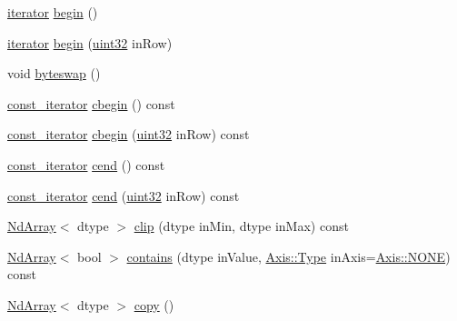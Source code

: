 \begin{DoxyCompactItemize}
\item 
\mbox{\hyperlink{class_num_c_1_1_nd_array_a49cd61f019d7106a40ffdb9c3ee98f08}{iterator}} \mbox{\hyperlink{class_num_c_1_1_nd_array_a3bba56461121f422750bd6b7a69bd9c4}{begin}} ()
\item 
\mbox{\hyperlink{class_num_c_1_1_nd_array_a49cd61f019d7106a40ffdb9c3ee98f08}{iterator}} \mbox{\hyperlink{class_num_c_1_1_nd_array_a6cca558bd443f861482a6856980fc80f}{begin}} (\mbox{\hyperlink{namespace_num_c_ae685802ca6d3035f2b400b081e3953fa}{uint32}} in\+Row)
\item 
void \mbox{\hyperlink{class_num_c_1_1_nd_array_a847dd08abd0ccc23ee792ab503cf60c1}{byteswap}} ()
\item 
\mbox{\hyperlink{class_num_c_1_1_nd_array_a445cec326684b0066bddae07ba06eddf}{const\+\_\+iterator}} \mbox{\hyperlink{class_num_c_1_1_nd_array_ac80d7125ea62fcd159e40387c2389081}{cbegin}} () const
\item 
\mbox{\hyperlink{class_num_c_1_1_nd_array_a445cec326684b0066bddae07ba06eddf}{const\+\_\+iterator}} \mbox{\hyperlink{class_num_c_1_1_nd_array_a15d151b34c7fa94d5710f07fe2327663}{cbegin}} (\mbox{\hyperlink{namespace_num_c_ae685802ca6d3035f2b400b081e3953fa}{uint32}} in\+Row) const
\item 
\mbox{\hyperlink{class_num_c_1_1_nd_array_a445cec326684b0066bddae07ba06eddf}{const\+\_\+iterator}} \mbox{\hyperlink{class_num_c_1_1_nd_array_a7299d5d8949b5348dde9d05f96f20b59}{cend}} () const
\item 
\mbox{\hyperlink{class_num_c_1_1_nd_array_a445cec326684b0066bddae07ba06eddf}{const\+\_\+iterator}} \mbox{\hyperlink{class_num_c_1_1_nd_array_ab0ec9dc7cfc8b4aaf2b89a4d05832c73}{cend}} (\mbox{\hyperlink{namespace_num_c_ae685802ca6d3035f2b400b081e3953fa}{uint32}} in\+Row) const
\item 
\mbox{\hyperlink{class_num_c_1_1_nd_array}{Nd\+Array}}$<$ dtype $>$ \mbox{\hyperlink{class_num_c_1_1_nd_array_a0e01615d14c68380987be493adf55258}{clip}} (dtype in\+Min, dtype in\+Max) const
\item 
\mbox{\hyperlink{class_num_c_1_1_nd_array}{Nd\+Array}}$<$ bool $>$ \mbox{\hyperlink{class_num_c_1_1_nd_array_a539de1546f457bf67a4c61188d783504}{contains}} (dtype in\+Value, \mbox{\hyperlink{struct_num_c_1_1_axis_a8e689044ef1941a03482e730c5e7ebb3}{Axis\+::\+Type}} in\+Axis=\mbox{\hyperlink{struct_num_c_1_1_axis_a8e689044ef1941a03482e730c5e7ebb3a0ae033c4226f7184bf0050b101e7ed94}{Axis\+::\+N\+O\+NE}}) const
\item 
\mbox{\hyperlink{class_num_c_1_1_nd_array}{Nd\+Array}}$<$ dtype $>$ \mbox{\hyperlink{class_num_c_1_1_nd_array_a1cac8d729a4ea624fd4512fc51b331e9}{copy}} ()

\end{DoxyCompactItemize}
